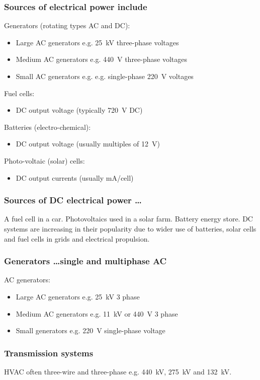 \documentclass[class=report, crop=false, 12pt,a4paper]{standalone}
\begin{document}
\subsubsection{Sources of electrical power include}
Generators (rotating types AC and DC):
\begin{itemize}
	\item Large AC generators e.g. \SI{25}{\kilo\volt} three-phase voltages
	\item Medium AC generators e.g. \SI{440}{\volt} three-phase voltages
	\item Small AC generators e.g. e.g. single-phase \SI{220}{\volt} voltages
\end{itemize}
Fuel cells:
\begin{itemize}
	\item DC output voltage (typically \SI{720}{\volt} DC)
\end{itemize}
Batteries (electro-chemical):
\begin{itemize}
	\item DC output voltage (usually multiples of \SI{12}{\volt})
\end{itemize}
Photo-voltaic (solar) cells:
\begin{itemize}
	\item DC output currents (usually mA/cell)
\end{itemize}
\subsubsection{Sources of DC electrical power \dots}
A fuel cell in a car. Photovoltaics used in a solar farm. Battery energy store. DC systems are increasing in their popularity due to wider use of batteries, solar cells and fuel cells in grids and electrical propulsion.
\subsubsection{Generators \dots single and multiphase AC}
AC generators:
\begin{itemize}
	\item Large AC generators e.g. \SI{25}{\kilo\volt} 3 phase
	\item Medium AC generators e.g. \SI{11}{\kilo\volt} or \SI{440}{\volt} 3 phase
	\item Small generators e.g. \SI{220}{\volt} single-phase voltage
\end{itemize}
\subsubsection{Transmission systems}
HVAC often three-wire and three-phase e.g. \SI{440}{\kilo\volt}, \SI{275}{\kilo\volt} and \SI{132}{\kilo\volt}. 
\end{document}
